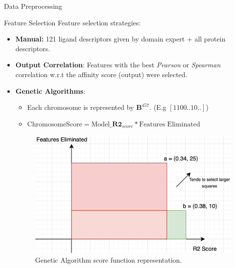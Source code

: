 \documentclass{beamer}
\begin{document}
\begin{frame}[t]{Data Preprocessing}
\end{frame}

\begin{frame}[t]{Feature Selection}
Feature selection strategies:
\begin{itemize}
\item \textbf{Manual:} 121 ligand descriptors given by domain expert + all protein descriptors.
\item \textbf{Output Correlation}: Features with the best \textit{Pearson} or \textit{Spearman} correlation w.r.t the affinity score (output) were selected.
\item \textbf{Genetic Algorithms}:  \cite{geneticalgorithmsresearchpaper}
\begin{itemize}
\item Each chromosome is represented by $\mathbf{B}^{457}$.  (E.g $[1100..10..]$)
\item $\mathrm{Chromosome Score} = \mathrm{Model}\_\mathbf{R2}_{score} * \textrm{Features Eliminated}$
\end{itemize}

\begin{figure}[htb]
  \centering
    \includegraphics[scale=0.25]{images/scoreFuntionMultiObject}
    \caption{Genetic Algorithm score function representation.}
    \label{fig:scorefunctionfigure}
\end{figure}

\end{itemize} 

\end{frame}
\end{document}
